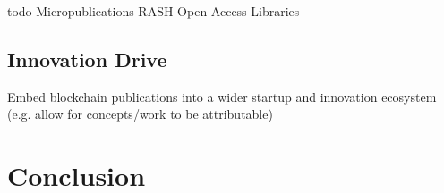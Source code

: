 \documentclass[twoside,twocolumn]{article}
\begin{document}
todo 
Micropublications
RASH
Open Access Libraries

 
\subsection{Innovation Drive} 
Embed blockchain publications into a wider startup and innovation ecosystem
(e.g. allow for concepts/work to be attributable)
 
\section{Conclusion}
\Blindtext





\end{document}
